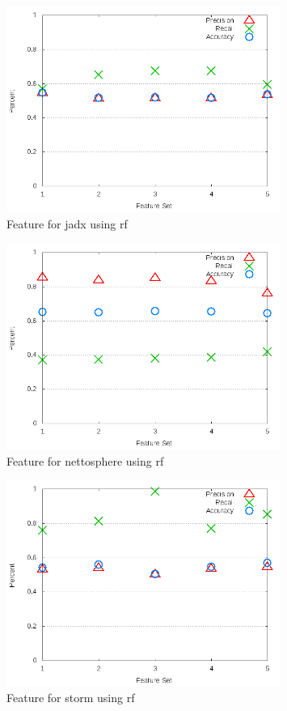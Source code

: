 \begin{figure}[!t]
\centering
\includegraphics[width=0.8\textwidth]{images/rf/test_3/jadx_sample_range.png}
\caption{Feature for jadx using \gls{rf}}
\label{fig:test_3_jadx_rf}
\end{figure}

\begin{figure}[!t]
\centering
\includegraphics[width=0.8\textwidth]{images/rf/test_3/nettosphere_sample_range.png}
\caption{Feature for nettosphere using \gls{rf}}
\label{fig:test_3_nettosphere_rf}
\end{figure}

\clearpage
\begin{figure}[!t]
\centering
\includegraphics[width=0.8\textwidth]{images/rf/test_3/storm_sample_range.png}
\caption{Feature for storm using \gls{rf}}
\label{fig:test_3_storm_rf}
\end{figure}

